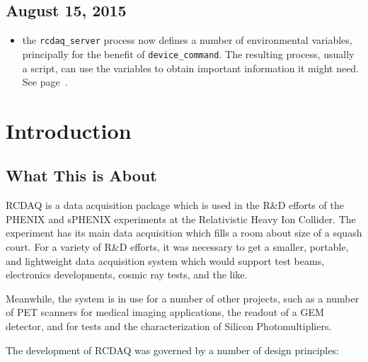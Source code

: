 \documentclass{article}[11pt]
\begin{document}
\subsection{August 15, 2015}
\begin{itemize}
\item the \verb|rcdaq_server| process now defines a number of environmental
  variables, principally for the benefit of  \verb|device_command|. The
  resulting process, usually a script, can use the variables to obtain important
  information it might need. See page~\pageref{environment}.
\end{itemize}

\newpage

\section{Introduction}


\subsection{What This is About}

RCDAQ is a data acquisition package which is used in the R\&D efforts
of the PHENIX and sPHENIX experiments at the Relativistic Heavy Ion
Collider.  The experiment has its main data acquisition which fills a
room about size of a squash court. For a variety of R\&D efforts, it
was necessary to get a smaller, portable, and lightweight data
acquisition system which would support test beams, electronics
developments, cosmic ray tests, and the like.

Meanwhile, the system is in use for a number of other projects, such
as a number of PET scanners for medical imaging applications, the
readout of a GEM detector, and for tests and the characterization of
Silicon Photomultipliers.


The development of RCDAQ was governed by a number of design principles:
\end{document}
